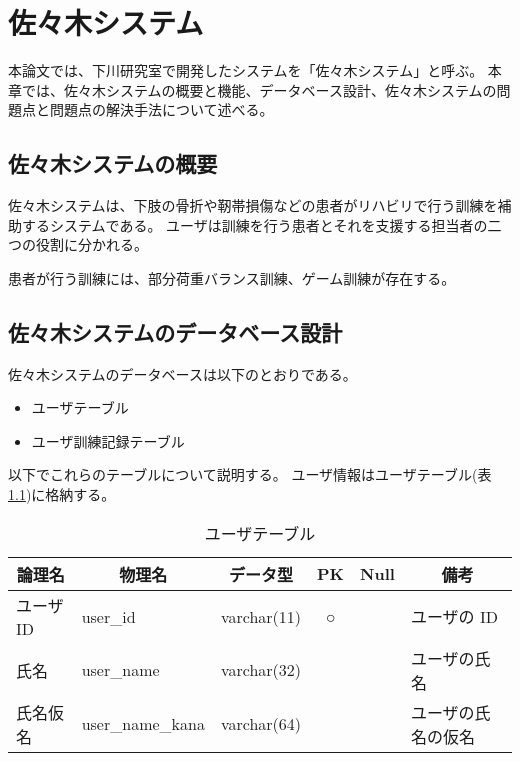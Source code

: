 \documentclass[uplatex,a4paper,12pt]{jsreport}
\begin{document}



\chapter{佐々木システム}\label{chap:kizon}
本論文では、下川研究室で開発したシステムを「佐々木システム」と呼ぶ。
本章では、佐々木システムの概要と機能、データベース設計、佐々木システムの問題点と問題点の解決手法について述べる。

\section{佐々木システムの概要}\label{sec:kizon_gaiyou}
佐々木システムは、下肢の骨折や靭帯損傷などの患者がリハビリで行う訓練を補助するシステムである。
ユーザは訓練を行う患者とそれを支援する担当者の二つの役割に分かれる。

患者が行う訓練には、部分荷重バランス訓練、ゲーム訓練が存在する。

\section{佐々木システムのデータベース設計}\label{sec:kizon_database}
佐々木システムのデータベースは以下のとおりである。

\begin{itemize}
  \item ユーザテーブル
  \item ユーザ訓練記録テーブル
\end{itemize}

以下でこれらのテーブルについて説明する。
ユーザ情報はユーザテーブル(表\ref{table:user})に格納する。

\begin{table}[htbp]
  \caption{ユーザテーブル}\label{table:user}
  \centering
  \begin{tabular}{|l|l|l|c|c|p{5cm}|}
    \hline
    \multicolumn{1}{|c|}{論理名} & \multicolumn{1}{c|}{物理名} & \multicolumn{1}{c|}{データ型} & PK & Null & \multicolumn{1}{c|}{備考} \\
    \hline
    \hline
    ユーザ ID & user\_id & varchar(11) & ○ &  & ユーザの ID \\
    \hline
    氏名 & user\_name & varchar(32) & & & ユーザの氏名 \\
    \hline
    氏名仮名 & user\_name\_kana & varchar(64) & & & ユーザの氏名の仮名 \\
    \hline
  \end{tabular}
\end{table}
\end{document}
